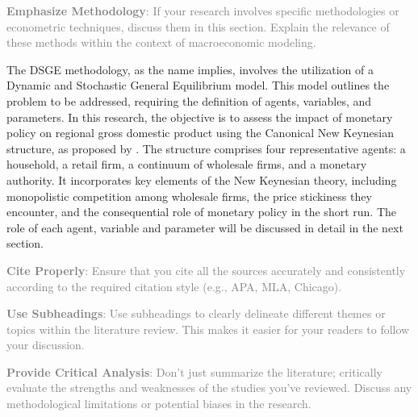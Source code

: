 \documentclass[../thesis.tex]{subfiles}
\begin{document}
	\textcolor{gray}{\textbf{Emphasize Methodology}: If your research involves specific methodologies or econometric techniques, discuss them in this section. Explain the relevance of these methods within the context of macroeconomic modeling.}


	The DSGE methodology, as the name implies, involves the utilization of a Dynamic and Stochastic General Equilibrium model. This model outlines the problem to be addressed, requiring the definition of agents, variables, and parameters. In this research, the objective is to assess the impact of monetary policy on regional gross domestic product using the Canonical New Keynesian structure, as proposed by \textcite{solis-garcia_ucb_2022}. The structure comprises four representative agents: a household, a retail firm, a continuum of wholesale firms, and a monetary authority. It incorporates key elements of the New Keynesian theory, including monopolistic competition among wholesale firms, the price stickiness they encounter, and the consequential role of monetary policy in the short run. The role of each agent, variable and parameter will be discussed in detail in the next section.

	\hrulefill

	\textcolor{gray}{\textbf{Cite Properly}: Ensure that you cite all the sources accurately and consistently according to the required citation style (e.g., APA, MLA, Chicago).}
	
	\textcolor{gray}{\textbf{Use Subheadings}: Use subheadings to clearly delineate different themes or topics within the literature review. This makes it easier for your readers to follow your discussion.}
	
	\textcolor{gray}{\textbf{Provide Critical Analysis}: Don't just summarize the literature; critically evaluate the strengths and weaknesses of the studies you've reviewed. Discuss any methodological limitations or potential biases in the research.}
\end{document}
